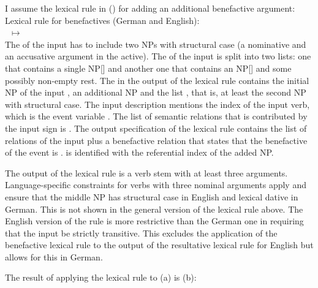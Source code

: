 \largerpage
I assume the lexical rule in () for adding an additional benefactive argument:
\eas
Lexical rule for benefactives (German and English):\\
~$\mapsto$\\
%
\zs
The \argstl of the input has to include two NPs with structural case (a nominative and an accusative
argument in the active). The \argstl of the input is split into two lists: one that contains a
single NP[\str] and another one that contains an NP[\str] and some possibly non-empty rest. The
\argst in the output of the lexical rule contains the initial NP of the input , an
additional NP and the list , that is, at least the second NP with structural case.
The input description mentions the index of the input verb, which is the event variable
. The list of semantic relations that is contributed by the input sign is . The
output specification of the lexical rule contains the list of relations of the input plus a
benefactive relation that states that the benefactive of the event  is .  is
identified with the referential index of the added NP.

The output of the lexical rule is a verb stem with at least three arguments. Language-specific
constraints for verbs with three nominal arguments apply and ensure that the middle NP has
structural case in English and lexical dative in German. This is not shown in the general version of
the lexical rule above. The English version of the rule is more restrictive than the German one in
requiring that the input be strictly transitive. This excludes the application of the benefactive
lexical rule to the output of the resultative lexical rule for English but allows for this in German.

The result of applying the lexical rule to (a) is (b):

